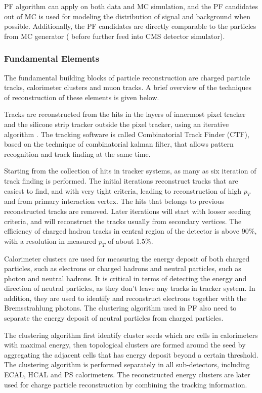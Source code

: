 PF algorithm can apply on both data and MC simulation, and the PF candidates out of MC is used for modeling the distribution of signal and background when possible. Additionally, the PF candidates are directly comparable to the particles from MC generator ( before further feed into CMS detector simulator).

\subsubsection*{Fundamental Elements}
\label{sec: PF elements}
The fundamental building blocks of particle reconstruction are charged particle tracks, calorimeter clusters and muon tracks. A brief overview of the techniques of reconstruction of these elements is given below.
 
Tracks are reconstructed from the hits in the layers of innermost pixel tracker and the silicone strip tracker outside the pixel tracker, using an iterative algorithm \cite{CMS_tracking}. The tracking software is called Combinatorial Track Finder (CTF), based on the technique of combinatorial kalman filter, that allows pattern recognition and track finding at the same time. 

Starting from the collection of hits in tracker systems, as many as six iteration of track finding is performed. The initial iterations reconstruct tracks that are easiest to find, and with very tight criteria, leading to reconstruction of high $p_T$ and from primary interaction vertex. The hits that belongs to previous reconstructed tracks are removed. Later iterations will start with looser seeding criteria, and will reconstruct the tracks usually from secondary vertices. The efficiency of charged hadron tracks in central region of the detector is above 90\%, with a resolution in measured $p_T$ of about 1.5\%.
 
Calorimeter clusters are used for measuring the energy deposit of both charged particles, such as electrons or charged hadrons and neutral particles, such as photon and neutral hadrons. It is critical in terms of detecting the energy and direction of neutral particles, as they don't leave any tracks in tracker system. In addition, they are used to identify and reconstruct electrons together with the Bremsstrahlung photons. The clustering algorithm used in PF also need to separate the energy deposit of neutral particles from charged particles. 

The clustering algorithm first identify cluster seeds which are cells in calorimeters with maximal energy, then topological clusters are formed around the seed by aggregating the adjacent cells that has energy deposit beyond a certain threshold. The clustering algorithm is performed separately in all sub-detectors, including ECAL, HCAL and PS calorimeters. The reconstructed energy clusters are later used for charge particle reconstruction by combining the tracking information.
 
